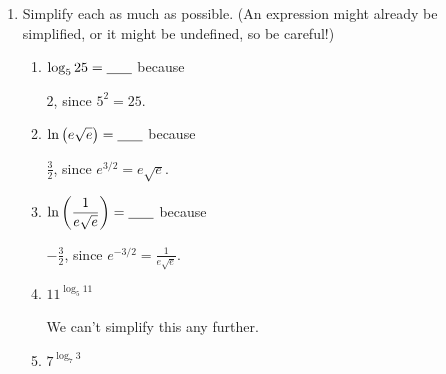 \documentclass{article}
\begin{document}
\begin{enumerate}
\item 


  Simplify each as much as possible. (An expression might already be simplified, or it might be undefined, so be careful!)

  \begin{enumerate}
  \item
    \begin{problem}
      $\displaystyle \log_5 25 = \fitb{0.25in}{}$ because 
    \end{problem}

    \begin{solution}
      $\boxed{2}$, since $5^2 = 25$.
    \end{solution}

  \item
    \begin{problem}
      $\displaystyle \ln \left( e \sqrt{e} \right) = \fitb{0.25in}{}$ because
    \end{problem}

    \begin{solution}
      $\boxed{\frac{3}{2}}$, since $e^{3/2} = e\sqrt{e}$.
    \end{solution}

  \item
    \begin{problem}
      $\displaystyle \ln \left( \frac{1}{e \sqrt{e}} \right) = \fitb{0.25in}{}$ because 
    \end{problem}

    \begin{solution}
      $\boxed{-\frac{3}{2}}$, since $e^{-3/2} = \frac{1}{e \sqrt{e}}$. 
    \end{solution}

  \item
    \begin{problem}[\vfill]
      $\displaystyle 11^{\log_5 11}$
    \end{problem}

    \begin{solution}
      We can't simplify this any further.
    \end{solution}

  \item
    \begin{problem}[\vfill]
      $\displaystyle 7^{\log_7 3}$
    \end{problem}


\end{enumerate}
\end{enumerate}
\end{document}
